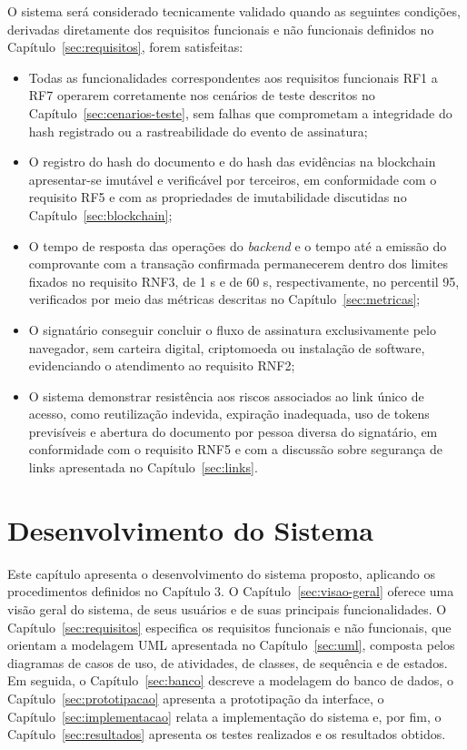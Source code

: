 \documentclass[
    12pt,
    a4paper,
    oneside,
    chapter=TITLE,
    section=TITLE,
    subsection=TITLE,
    subsubsection=TITLE,
    sumario=tradicional,
    english,
    brazil
]{abntex2}
\begin{document}
O sistema será considerado tecnicamente validado quando as seguintes condições, derivadas diretamente dos requisitos funcionais e não funcionais definidos no Capítulo~\ref{sec:requisitos}, forem satisfeitas:
\begin{itemize}
\item Todas as funcionalidades correspondentes aos requisitos funcionais RF1 a RF7 operarem corretamente nos cenários de teste descritos no Capítulo~\ref{sec:cenarios-teste}, sem falhas que comprometam a integridade do hash registrado ou a rastreabilidade do evento de assinatura;

\item O registro do hash do documento e do hash das evidências na blockchain apresentar-se imutável e verificável por terceiros, em conformidade com o requisito RF5 e com as propriedades de imutabilidade discutidas no Capítulo~\ref{sec:blockchain};

\item O tempo de resposta das operações do \emph{backend} e o tempo até a emissão do comprovante com a transação confirmada permanecerem dentro dos limites fixados no requisito RNF3, de 1 s e de 60 s, respectivamente, no percentil 95, verificados por meio das métricas descritas no Capítulo~\ref{sec:metricas};

\item O signatário conseguir concluir o fluxo de assinatura exclusivamente pelo navegador, sem carteira digital, criptomoeda ou instalação de software, evidenciando o atendimento ao requisito RNF2;

\item O sistema demonstrar resistência aos riscos associados ao link único de acesso, como reutilização indevida, expiração inadequada, uso de tokens previsíveis e abertura do documento por pessoa diversa do signatário, em conformidade com o requisito RNF5 e com a discussão sobre segurança de links apresentada no Capítulo~\ref{sec:links}.
\end{itemize}

\chapter{Desenvolvimento do Sistema}

Este capítulo apresenta o desenvolvimento do sistema proposto,
aplicando os procedimentos definidos no Capítulo 3. O
Capítulo~\ref{sec:visao-geral} oferece uma visão geral do sistema, de
seus usuários e de suas principais funcionalidades. O
Capítulo~\ref{sec:requisitos} especifica os requisitos funcionais e não
funcionais, que orientam a modelagem UML apresentada no
Capítulo~\ref{sec:uml}, composta pelos diagramas de casos de uso, de
atividades, de classes, de sequência e de estados. Em seguida, o
Capítulo~\ref{sec:banco} descreve a modelagem do banco de dados, o
Capítulo~\ref{sec:prototipacao} apresenta a prototipação da interface, o
Capítulo~\ref{sec:implementacao} relata a implementação do sistema e,
por fim, o Capítulo~\ref{sec:resultados} apresenta os testes realizados
e os resultados obtidos.
\end{document}
